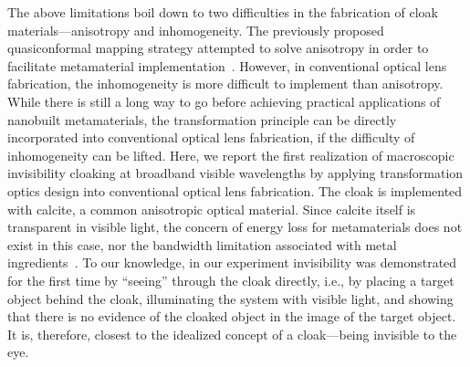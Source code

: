 \documentclass[preprint,preprintnumbers,amsmath,amssymb]{revtex4}
\begin{document}
The above limitations boil down to two difficulties in the
fabrication of cloak materials---anisotropy and inhomogeneity. The
previously proposed quasiconformal mapping strategy attempted to
solve anisotropy in order to facilitate metamaterial
implementation~\cite{li_carpet}. However, in conventional optical
lens fabrication, the inhomogeneity is more difficult to implement
than anisotropy. While there is still a long way to go before
achieving practical applications of nanobuilt metamaterials, the
transformation principle can be directly incorporated into
conventional optical lens fabrication, if the difficulty of
inhomogeneity can be lifted. Here, we report the first realization
of macroscopic invisibility cloaking at broadband visible
wavelengths by applying transformation optics design into
conventional optical lens fabrication. The cloak is implemented with
calcite, a common anisotropic optical material. Since calcite itself
is transparent in visible light, the concern of energy loss for
metamaterials does not exist in this case, nor the bandwidth
limitation associated with metal ingredients~\cite{huanyang_review}.
To our knowledge, in our experiment invisibility was demonstrated
for the first time by ``seeing'' through the cloak directly, i.e.,
by placing a target object behind the cloak, illuminating the system
with visible light, and showing that there is no evidence of the
cloaked object in the image of the target object. It is, therefore,
closest to the idealized concept of a cloak---being invisible to the
eye.
\end{document}

